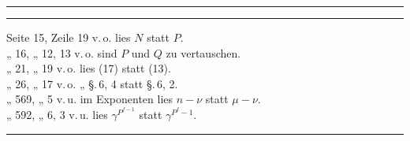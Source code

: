 \begin{center}
\rule{6em}{0.4pt}
\end{center}

\begin{center}
\textbf{}
\end{center}

\begin{center}
\rule{6em}{0.4pt}
\end{center}

\begin{flushleft}
Seite 15, Zeile 19 v.\,o. lies $N$ statt $P$. \\
„ 16, „ 12, 13 v.\,o. sind $P$ und $Q$ zu vertauschen. \\
„ 21, „ 19 v.\,o. lies (17) statt (13). \\
„ 26, „ 17 v.\,o. „ \S.\,6, 4 statt \S.\,6, 2. \\
„ 569, „ 5 v.\,u. im Exponenten lies $n-\nu$ statt $\mu-\nu$. \\
„ 592, „ 6, 3 v.\,u. lies $\gamma^{P^{f-1}}$ statt $\gamma^{P^f-1}$.
\end{flushleft}

\begin{center}
\rule{6em}{0.4pt}
\end{center}
